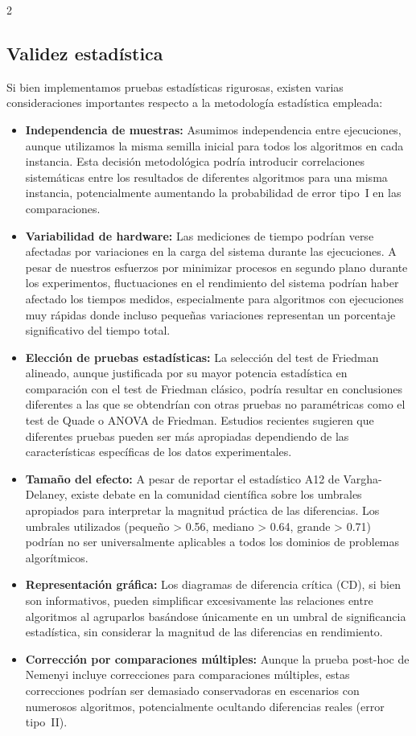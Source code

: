 \documentclass[10pt,a4paper]{extarticle}
\begin{document}
\begin{table}[!htbp]
\begin{multicols}{2}
\subsection{Validez estadística}
Si bien implementamos pruebas estadísticas rigurosas, existen varias consideraciones importantes respecto a la metodología estadística empleada:
\begin{itemize}
\item \textbf{Independencia de muestras:} Asumimos independencia entre ejecuciones, aunque utilizamos la misma semilla inicial para todos los algoritmos en cada instancia. Esta decisión metodológica podría introducir correlaciones sistemáticas entre los resultados de diferentes algoritmos para una misma instancia, potencialmente aumentando la probabilidad de error tipo~I en las comparaciones.
\item \textbf{Variabilidad de hardware:} Las mediciones de tiempo podrían verse afectadas por variaciones en la carga del sistema durante las ejecuciones. A pesar de nuestros esfuerzos por minimizar procesos en segundo plano durante los experimentos, fluctuaciones en el rendimiento del sistema podrían haber afectado los tiempos medidos, especialmente para algoritmos con ejecuciones muy rápidas donde incluso pequeñas variaciones representan un porcentaje significativo del tiempo total.
\item \textbf{Elección de pruebas estadísticas:} La selección del test de Friedman alineado, aunque justificada por su mayor potencia estadística en comparación con el test de Friedman clásico, podría resultar en conclusiones diferentes a las que se obtendrían con otras pruebas no paramétricas como el test de Quade o ANOVA de Friedman. Estudios recientes sugieren que diferentes pruebas pueden ser más apropiadas dependiendo de las características específicas de los datos experimentales.
\item \textbf{Tamaño del efecto:} A pesar de reportar el estadístico A12 de Vargha-Delaney, existe debate en la comunidad científica sobre los umbrales apropiados para interpretar la magnitud práctica de las diferencias. Los umbrales utilizados (pequeño > 0.56, mediano > 0.64, grande > 0.71) podrían no ser universalmente aplicables a todos los dominios de problemas algorítmicos.
\item \textbf{Representación gráfica:} Los diagramas de diferencia crítica (CD), si bien son informativos, pueden simplificar excesivamente las relaciones entre algoritmos al agruparlos basándose únicamente en un umbral de significancia estadística, sin considerar la magnitud de las diferencias en rendimiento.
\item \textbf{Corrección por comparaciones múltiples:} Aunque la prueba post-hoc de Nemenyi incluye correcciones para comparaciones múltiples, estas correcciones podrían ser demasiado conservadoras en escenarios con numerosos algoritmos, potencialmente ocultando diferencias reales (error tipo~II).
\end{itemize}


\end{multicols}
\end{table}
\end{document}
